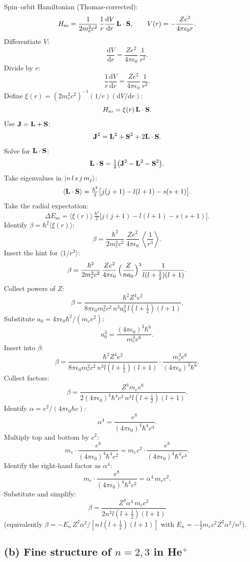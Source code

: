 \documentclass[11pt]{article}
\newcommand{\de}{\mathrm{d}}
\begin{document}
Spin--orbit Hamiltonian (Thomas-corrected):
\[
H_\text{so} = \frac{1}{2m_e^2 c^2}\,\frac{1}{r}\frac{\de V}{\de r}\,\vb L\cdot\vb S,
\qquad V(r) = -\frac{Ze^2}{4\pi\epsilon_0 r}.
\]
Differentiate $V$:
\[
\frac{\de V}{\de r} = \frac{Ze^2}{4\pi\epsilon_0}\,\frac{1}{r^2}.
\]
Divide by $r$:
\[
\frac{1}{r}\frac{\de V}{\de r} = \frac{Ze^2}{4\pi\epsilon_0}\,\frac{1}{r^3}.
\]
Define $\xi(r)=(2m_e^2 c^2)^{-1}(1/r)(\de V/\de r)$:
\[
H_\text{so} = \xi(r)\,\vb L\cdot\vb S.
\]
Use $\vb J=\vb L+\vb S$:
\[
\vb J^2 = \vb L^2 + \vb S^2 + 2\vb L\cdot\vb S.
\]
Solve for $\vb L\cdot\vb S$:
\[
\vb L\cdot\vb S = \tfrac{1}{2}\bigl(\vb J^2 - \vb L^2 - \vb S^2\bigr).
\]
Take eigenvalues in $\ket{n\,l\,s\,j\,m_j}$:
\[
\langle\vb L\cdot\vb S\rangle = \tfrac{\hbar^2}{2}\bigl[j(j+1)-l(l+1)-s(s+1)\bigr].
\]
Take the radial expectation:
\[
\Delta E_\text{so} = \langle\xi(r)\rangle\,\tfrac{\hbar^2}{2}\bigl[j(j+1)-l(l+1)-s(s+1)\bigr].
\]
Identify $\beta = \hbar^2\langle\xi(r)\rangle$:
\[
\beta = \frac{\hbar^2}{2m_e^2 c^2}\,\frac{Ze^2}{4\pi\epsilon_0}\,\left\langle\frac{1}{r^3}\right\rangle.
\]
Insert the hint for $\langle 1/r^3\rangle$:
\[
\beta = \frac{\hbar^2}{2m_e^2 c^2}\,\frac{Ze^2}{4\pi\epsilon_0}\,\Bigl(\frac{Z}{na_0}\Bigr)^3\frac{1}{l(l+\tfrac12)(l+1)}.
\]
Collect powers of $Z$:
\[
\beta = \frac{\hbar^2 Z^4 e^2}{8\pi\epsilon_0 m_e^2 c^2\, n^3 a_0^3\, l(l+\tfrac12)(l+1)}.
\]
Substitute $a_0=4\pi\epsilon_0\hbar^2/(m_e e^2)$:
\[
a_0^3 = \frac{(4\pi\epsilon_0)^3\hbar^6}{m_e^3 e^6}.
\]
Insert into $\beta$:
\[
\beta = \frac{\hbar^2 Z^4 e^2}{8\pi\epsilon_0 m_e^2 c^2\, n^3 l(l+\tfrac12)(l+1)}\cdot\frac{m_e^3 e^6}{(4\pi\epsilon_0)^3\hbar^6}.
\]
Collect factors:
\[
\beta = \frac{Z^4 m_e e^8}{2(4\pi\epsilon_0)^4\hbar^4 c^2\, n^3 l(l+\tfrac12)(l+1)}.
\]
Identify $\alpha=e^2/(4\pi\epsilon_0\hbar c)$:
\[
\alpha^4 = \frac{e^8}{(4\pi\epsilon_0)^4\hbar^4 c^4}.
\]
Multiply top and bottom by $c^2$:
\[
m_e\cdot\frac{e^8}{(4\pi\epsilon_0)^4\hbar^4 c^2} = m_e c^2\cdot\frac{e^8}{(4\pi\epsilon_0)^4\hbar^4 c^4}.
\]
Identify the right-hand factor as $\alpha^4$:
\[
m_e\cdot\frac{e^8}{(4\pi\epsilon_0)^4\hbar^4 c^2} = \alpha^4\,m_e c^2.
\]
Substitute and simplify:
\[
\boxed{\;\beta = \frac{Z^4\alpha^4\, m_e c^2}{2 n^3 l(l+\tfrac12)(l+1)}\;}
\]
(equivalently $\beta = -E_n\,Z^2\alpha^2/[n\,l(l+\tfrac12)(l+1)]$ with $E_n=-\tfrac{1}{2}m_ec^2 Z^2\alpha^2/n^2$).

\subsection*{(b) Fine structure of $n=2,3$ in He$^+$}
\end{document}
